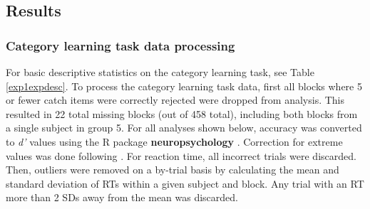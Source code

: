 \documentclass[../dissertation.tex]{subfiles}
\begin{document}
\subsection{Results}

\subsubsection{Category learning task data processing}
	For basic descriptive statistics on the category learning task, see Table \ref{exp1expdesc}. To process the category learning task data, first all blocks where 5 or fewer catch items were correctly rejected were dropped from analysis. This resulted in 22 total missing blocks (out of 458 total), including both blocks from a single subject in group 5. For all analyses shown below, accuracy was converted to \textit{d'} values \citep{macmillan2004} using the R package \textbf{neuropsychology} \citep{neuropsych}. Correction for extreme values was done following \citet{Hautus1995}. For reaction time, all incorrect trials were discarded. Then, outliers were removed on a by-trial basis by calculating the mean and standard deviation of RTs within a given subject and block. Any trial with an RT more than 2 SDs away from the mean was discarded.   \par
\end{document}
